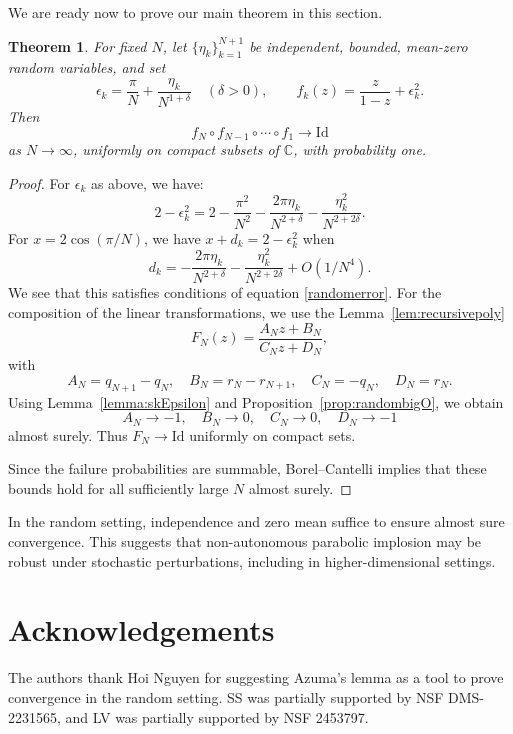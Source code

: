 \documentclass{amsart}
\newtheorem{mainthm}{Theorem}
\theoremstyle{remark}
\theoremstyle{definition}
\begin{document}
We are ready now to prove our main theorem in this section.

\begin{mainthm}

For fixed \(N\), let \(\{\eta_{k}\}_{k=1}^{N+1}\) be independent, bounded, mean-zero random variables, and set
\[
   \epsilon_{k} = \frac{\pi}{N}+\frac{\eta_{k}}{N^{1+\delta}}\quad (\delta>0), 
   \qquad
   f_k(z) = \frac{z}{1-z} + \epsilon_k^2 .
\]
Then
\[
   f_N\circ f_{N-1}\circ \cdots\circ f_1 \longrightarrow \mathrm{Id}
\]
as \(N\to\infty\), uniformly on compact subsets of $\mathbb{C}$, with probability one.
\end{mainthm}

\begin{proof}
For $\epsilon_k$ as above, we have:
\[
2-\epsilon_k^2=2-\frac{\pi^2}{N^2}-\frac{2\pi\eta_k}{N^{2+\delta}}-\frac{\eta_k^2}{N^{2+2\delta}}.
\]
For $x=2\cos(\pi/N)$, we have
$x+d_k=2-\epsilon_k^2$ when
\[
d_k=-\frac{2\pi\eta_k}{N^{2+\delta}}-\frac{\eta_k^2}{N^{2+2\delta}}+O(1/N^4).
\]
We see that this satisfies conditions of equation \ref{randomerror}.
For the composition of the linear transformations, we use the 
Lemma~\ref{lem:recursivepoly} 
\[
F_N(z)=\frac{A_N z+B_N}{C_N z+D_N},
\]
with
\[
A_N=q_{N+1}-q_N,\quad
B_N=r_N-r_{N+1},\quad
C_N=-q_N,\quad
D_N=r_N.
\]
Using Lemma~\ref{lemma:skEpsilon} and Proposition~\ref{prop:randombigO}, we obtain
\[
A_N\to -1,\quad B_N\to 0,\quad C_N\to 0,\quad D_N\to -1
\]
almost surely.  
Thus $F_N\to\mathrm{Id}$ uniformly on compact sets.

Since the failure probabilities are summable, Borel--Cantelli implies that these bounds hold for all sufficiently large $N$ almost surely.
\end{proof}
 
In the random setting, independence and zero mean suffice to ensure almost sure convergence. This suggests that non-autonomous parabolic implosion may be robust under stochastic perturbations, including in higher-dimensional settings.

\section*{Acknowledgements}
The authors thank Hoi Nguyen for suggesting Azuma's lemma as a tool to prove convergence in the random setting. SS was partially supported by NSF DMS-2231565, and LV was partially supported by NSF 2453797. 




\nocite{*}
\end{document}
